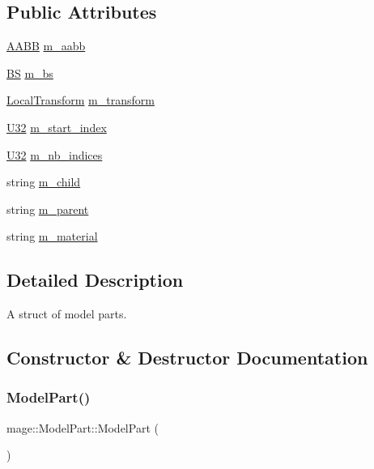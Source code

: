 \subsection*{Public Attributes}
\begin{DoxyCompactItemize}
\item 
\hyperlink{classmage_1_1_a_a_b_b}{A\+A\+BB} \hyperlink{structmage_1_1_model_part_ab5b4cb74ac7d725896825b0f7ce8472a}{m\+\_\+aabb}
\item 
\hyperlink{classmage_1_1_b_s}{BS} \hyperlink{structmage_1_1_model_part_a551f6c340fa5547364e6cde9720ad856}{m\+\_\+bs}
\item 
\hyperlink{classmage_1_1_local_transform}{Local\+Transform} \hyperlink{structmage_1_1_model_part_a557a14038880ca6ba6d4ce7a8d81b774}{m\+\_\+transform}
\item 
\hyperlink{namespacemage_a41c104c036fba3756a74e19f793eeaa1}{U32} \hyperlink{structmage_1_1_model_part_a3151ca6c89bad26bc454aca693be97c4}{m\+\_\+start\+\_\+index}
\item 
\hyperlink{namespacemage_a41c104c036fba3756a74e19f793eeaa1}{U32} \hyperlink{structmage_1_1_model_part_ad4be9d829693ccb96bb45fc18aa0ede8}{m\+\_\+nb\+\_\+indices}
\item 
string \hyperlink{structmage_1_1_model_part_abac2e9942c2d8015dc8b4f363729dc45}{m\+\_\+child}
\item 
string \hyperlink{structmage_1_1_model_part_ad4754bbb69d28885c09cef591d4d96c5}{m\+\_\+parent}
\item 
string \hyperlink{structmage_1_1_model_part_a606603dd01b895cb1aa91b51089bf27f}{m\+\_\+material}
\end{DoxyCompactItemize}


\subsection{Detailed Description}
A struct of model parts. 

\subsection{Constructor \& Destructor Documentation}
\hypertarget{structmage_1_1_model_part_a4dd57bba5fcd2af3baaf62fd62536400}{}\label{structmage_1_1_model_part_a4dd57bba5fcd2af3baaf62fd62536400} 
\subsubsection{\texorpdfstring{Model\+Part()}{ModelPart()}\hspace{0.1cm}{\footnotesize\ttfamily [1/3]}}
{\footnotesize\ttfamily mage\+::\+Model\+Part\+::\+Model\+Part (\begin{DoxyParamCaption}{ }\end{DoxyParamCaption})}

